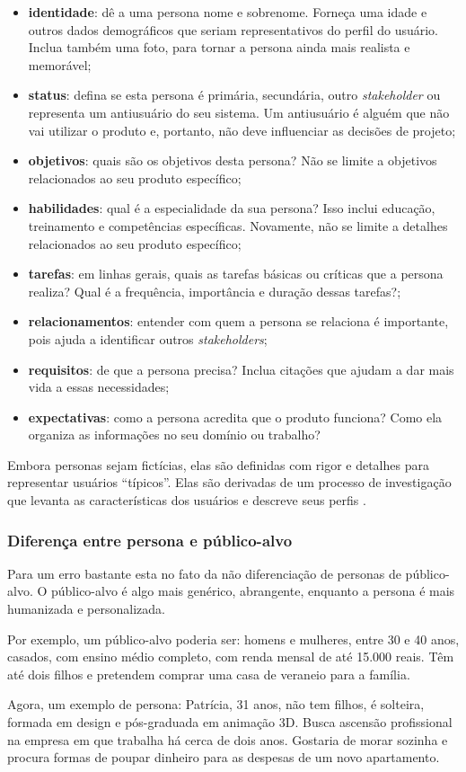 \begin{itemize}
	\item \textbf{identidade}: dê a uma persona nome e sobrenome. Forneça uma idade e outros dados demográficos que seriam representativos do perfil do usuário. Inclua também uma foto, para tornar a persona ainda mais realista e memorável;
	\item \textbf{status}: defina se esta persona é primária, secundária, outro \textit{stakeholder} ou representa um antiusuário do seu sistema. Um antiusuário é alguém que não vai utilizar o produto e, portanto, não deve influenciar as decisões de projeto;
	\item \textbf{objetivos}: quais são os objetivos desta persona? Não se limite a objetivos relacionados ao seu produto específico;
	\item \textbf{habilidades}: qual é a especialidade da sua persona? Isso inclui educação, treinamento e competências específicas. Novamente, não se limite a detalhes relacionados ao seu produto específico;
	\item \textbf{tarefas}: em linhas gerais, quais as tarefas básicas ou críticas que a persona realiza? Qual é a frequência, importância e duração dessas tarefas?;
	\item \textbf{relacionamentos}: entender com quem a persona se relaciona é importante, pois ajuda a identificar outros \textit{stakeholders};
	\item \textbf{requisitos}: de que a persona precisa? Inclua citações que ajudam a dar mais vida a essas necessidades;
	\item \textbf{expectativas}: como a persona acredita que o produto funciona? Como ela organiza as informações no seu domínio ou trabalho?
\end{itemize}

Embora personas sejam fictícias, elas são definidas com rigor e detalhes para representar usuários ``típicos''. Elas são derivadas de um processo de investigação que levanta as características dos usuários e descreve seus perfis \cite{barbosa2010IHC}.

\subsubsection{Diferença entre persona e público-alvo}

Para  um erro bastante esta no fato da não diferenciação de personas de público-alvo. O público-alvo é algo mais genérico, abrangente, enquanto a persona é mais humanizada e personalizada.

Por exemplo, um público-alvo poderia ser: homens e mulheres, entre 30 e 40 anos, casados, com ensino médio completo, com renda mensal de até 15.000 reais. Têm até dois filhos e pretendem comprar uma casa de veraneio para a família.

Agora, um exemplo de persona: Patrícia, 31 anos, não tem filhos, é solteira, formada em design e pós-graduada em animação 3D. Busca ascensão profissional na empresa em que trabalha há cerca de dois anos. Gostaria de morar sozinha e procura formas de poupar dinheiro para as despesas de um novo apartamento.




